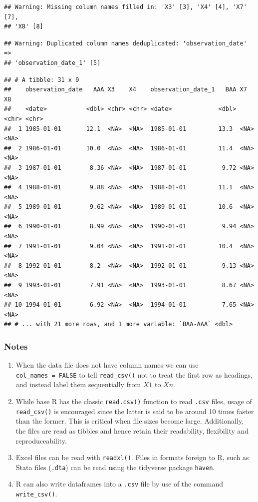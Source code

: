 \documentclass[11pt,]{article}
\begin{document}
\begin{verbatim}
## Warning: Missing column names filled in: 'X3' [3], 'X4' [4], 'X7' [7],
## 'X8' [8]
\end{verbatim}

\begin{verbatim}
## Warning: Duplicated column names deduplicated: 'observation_date' =>
## 'observation_date_1' [5]
\end{verbatim}

\begin{verbatim}
## # A tibble: 31 x 9
##    observation_date   AAA X3    X4    observation_date_1   BAA X7    X8   
##    <date>           <dbl> <chr> <chr> <date>             <dbl> <chr> <chr>
##  1 1985-01-01       12.1  <NA>  <NA>  1985-01-01         13.3  <NA>  <NA> 
##  2 1986-01-01       10.0  <NA>  <NA>  1986-01-01         11.4  <NA>  <NA> 
##  3 1987-01-01        8.36 <NA>  <NA>  1987-01-01          9.72 <NA>  <NA> 
##  4 1988-01-01        9.88 <NA>  <NA>  1988-01-01         11.1  <NA>  <NA> 
##  5 1989-01-01        9.62 <NA>  <NA>  1989-01-01         10.6  <NA>  <NA> 
##  6 1990-01-01        8.99 <NA>  <NA>  1990-01-01          9.94 <NA>  <NA> 
##  7 1991-01-01        9.04 <NA>  <NA>  1991-01-01         10.4  <NA>  <NA> 
##  8 1992-01-01        8.2  <NA>  <NA>  1992-01-01          9.13 <NA>  <NA> 
##  9 1993-01-01        7.91 <NA>  <NA>  1993-01-01          8.67 <NA>  <NA> 
## 10 1994-01-01        6.92 <NA>  <NA>  1994-01-01          7.65 <NA>  <NA> 
## # ... with 21 more rows, and 1 more variable: `BAA-AAA` <dbl>
\end{verbatim}

\subsubsection{Notes}\label{notes}

\begin{enumerate}
\def\labelenumi{\arabic{enumi}.}
\item
  When the data file does not have column names we can use
  \texttt{col\_names\ =\ FALSE} to tell \texttt{read\_csv()} not to
  treat the first row as headings, and instead label them sequentially
  from \(X1\) to \(Xn\).
\item
  While base R has the classic \texttt{read.csv()} function to read
  \texttt{.csv} files, usage of \texttt{read\_csv()} is encouraged since
  the latter is said to be around 10 times faster than the former. This
  is critical when file sizes become large. Additionally, the files are
  read as tibbles and hence retain their readability, flexibility and
  reproduceability.
\item
  Excel files can be read with \texttt{readxl()}. Files in formats
  foreign to R, such as Stata files (\texttt{.dta}) can be read using
  the tidyverse package \texttt{haven}.
\item
  R can also write dataframes into a \texttt{.csv} file by use of the
  command \texttt{write\_csv()}.
\end{enumerate}
\end{document}
